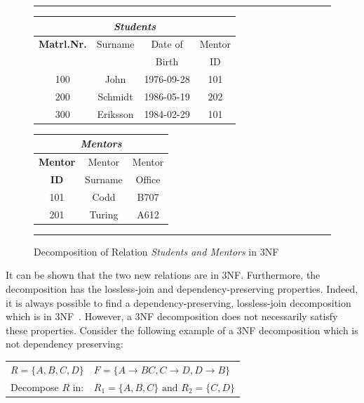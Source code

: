 \begin{figure}[h]
\hrule
\vspace{0.5cm}

\begin{minipage}[t]{0.5\linewidth}\centering
\begin{tabular}{|c|c|c|c|}
\hline
\multicolumn{4}{|c|}{\textit{Students}} \\
\hline
\textbf{Matrl.Nr.} & Surname & Date of  & Mentor \\
                   &         & Birth    & ID     \\
\hline \hline
100 & John     & 1976-09-28 & 101 \\
200 & Schmidt  & 1986-05-19 & 202 \\
300 & Eriksson & 1984-02-29 & 101 \\
\hline
\end{tabular}
\end{minipage}
\hspace{0.5cm}
\begin{minipage}[t]{0.5\linewidth}\centering
\begin{tabular}{|c|c|c|}
\hline
\multicolumn{3}{|c|}{\textit{Mentors}} \\ \hline
 \textbf{Mentor} & Mentor  & Mentor \\
 \textbf{ID}     & Surname & Office \\
 \hline \hline
 101 & Codd   & B707 \\
 201 & Turing & A612 \\ \hline
\end{tabular}
\end{minipage}

\caption{Decomposition of Relation \textit{Students and Mentors} in 3NF}\label{alg:relsc3nf}
\hrule
\end{figure}

It can be shown that the two new relations are in 3NF. Furthermore, the 
decomposition has the lossless-join and dependency-preserving properties. Indeed, it is always 
possible to find a dependency-preserving, lossless-join decomposition which is in 3NF~\cite[Section 6.8]{bdb2}.
However, a 3NF decomposition does not necessarily satisfy these properties. Consider the following example
of a 3NF decomposition which is not dependency preserving:

\begin{center}
\begin{tabular}[h]{l l}
  $R = \{A, B, C, D\}$ & $F = \{A \rightarrow BC, C \rightarrow D, D \rightarrow B\}$ \\
  Decompose $R$ in:  & $R_1 = \{A, B, C\} \mbox{ and } R_2 = \{C,D\}$ \\ 
\end{tabular}
\end{center}

